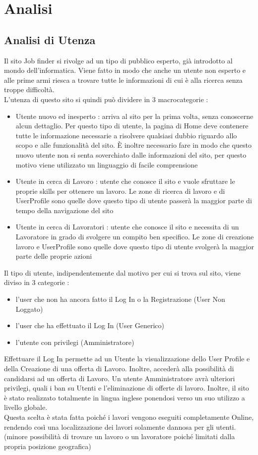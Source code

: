 \section{Analisi}
	\subsection{Analisi di Utenza}
	
	Il sito Job finder si rivolge ad un tipo di pubblico esperto, già introdotto al mondo dell’informatica. Viene fatto in modo che anche un utente non esperto e alle prime armi riesca a trovare tutte le informazioni di cui è alla ricerca senza troppe difficoltà.
	\\	L’utenza di questo sito si quindi può dividere in 3 macrocategorie :
	\begin{itemize}
		\item 	Utente nuovo ed inesperto : arriva al sito per la prima volta, senza conoscerne alcun dettaglio. Per questo tipo di utente, la pagina di Home deve contenere tutte le informazione necessarie a risolvere qualsiasi dubbio riguardo allo scopo e alle funzionalità del sito. È inoltre necessario fare in modo che questo nuovo utente non si senta soverchiato dalle informazioni del sito, per questo motivo viene utilizzato un linguaggio di facile comprensione
		\item Utente in cerca di Lavoro : utente che conosce il sito e vuole sfruttare le proprie skills per ottenere un lavoro. Le zone di ricerca di lavoro e di UserProfile sono quelle dove questo tipo di utente passerà la maggior parte di tempo della navigazione del sito
		\item Utente in cerca di Lavoratori : utente che conosce il sito e necessita di un Lavoratore in grado di svolgere un compito ben specifico. Le zone di creazione lavoro e UserProfile sono quelle dove questo tipo di utente svolgerà la maggior parte delle proprie azioni
	\end{itemize}
	Il tipo di utente, indipendentemente dal motivo per cui si trova sul sito, viene diviso in 3 categorie :
	\begin{itemize} 
		\item l’user che non ha ancora fatto il Log In o la Registrazione (User Non Loggato)
		\item l’user che ha effettuato il Log In (User Generico) 
		\item l’utente con privilegi (Amministratore)
	\end{itemize}
	Effettuare il Log In permette ad un Utente la visualizzazione dello User Profile e della Creazione di una offerta di Lavoro. Inoltre, accederà alla possibilità di candidarsi ad un offerta di Lavoro.
	Un utente Amministratore avrà ulteriori privilegi, quali i ban su Utenti e l’eliminazione di offerte di lavoro.
	Inoltre, il sito è stato realizzato totalmente in lingua inglese ponendosi verso un suo utilizzo a livello globale. 
	\\Questa scelta è stata fatta poiché i lavori vengono eseguiti completamente Online, rendendo così una localizzazione dei lavori solamente dannosa per gli utenti. (minore possibilità di trovare un lavoro o un lavoratore poiché limitati dalla propria posizione geografica)
